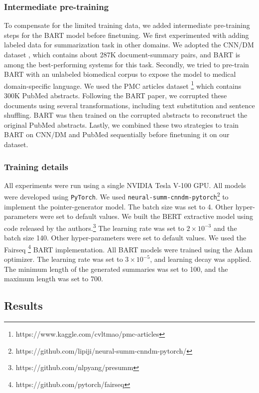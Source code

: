 \documentclass[letterpaper, table]{article}
\begin{document}
\subsubsection{Intermediate pre-training}
\label{sec:inter-pretraining}
To compensate for the limited training data, we added intermediate pre-training steps for the BART model before finetuning.
We first experimented with adding labeled data for summarization task in other domains. We adopted the CNN/DM dataset \cite{nallapati2016abstractive}, which contains about 287K document-summary pairs, and BART is among the best-performing systems for this task. %
Secondly, we tried to pre-train BART with an unlabeled biomedical corpus to expose the model to medical domain-specific language. We used the PMC articles dataset \footnote{https://www.kaggle.com/cvltmao/pmc-articles}
which contains 300K PubMed abstracts. Following the BART paper, we corrupted these documents using several transformations, including text substitution and sentence shuffling. BART was then trained on the corrupted abstracts to reconstruct the original PubMed abstracts. Lastly, we combined these two strategies to train BART on CNN/DM and PubMed sequentially before finetuning it on our dataset.
\subsubsection{Training details}
All experiments were run using a single NVIDIA Tesla V-100 GPU. All models were developed using \texttt{PyTorch}.
We used \texttt{neural-summ-cnndm-pytorch}\footnote{https://github.com/lipiji/neural-summ-cnndm-pytorch/} to implement the pointer-generator model. The batch size was set to 4. Other hyper-parameters were set to default values. We built the BERT extractive model using code released by the authors.\footnote{https://github.com/nlpyang/presumm}
The learning rate was set to $2 \times 10^{-3}$ and the batch size 140. Other hyper-parameters were set to default values. We used the Fairseq \footnote{https://github.com/pytorch/fairseq} BART implementation. All BART models were trained using the Adam optimizer. The learning rate was set to $3 \times 10^{-5}$, and learning decay was applied. The minimum length of the generated summaries was set to 100, and the maximum length was set to 700.
\subsection{Results}
\end{document}
